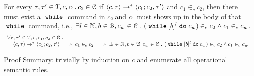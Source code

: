 %
\begin{lem}
	\label{lem:inv_while}
	For every $\mathtt{\tau}, \mathtt{\tau}' \in \mathcal{T}, c, c_1, c_2 \in \mathcal{C}$ 
	if $ \langle c, \mathtt{\tau} \rangle \rightarrow^* \langle c_1; c_2, \mathtt{\tau}' \rangle$ and 
	$c_1 \in_c c_2$, 
	then there must exist a $\;\mathtt{while}\;$ command in $c_2$ and $c_1$ must shows up in the body of that $\;\mathtt{while}\;$ command,
	 i.e., $\exists l \in \mathbb{N}, b \in \mathcal{B}, c_w \in \mathcal{C} ~.~ 
	(\;\mathtt{while}\; [b]^l \;\mathtt{do}\; c_w) \in_c c_2 \land c_1 \in_c c_w$.
	\[
	\begin{array}{l}
	\forall \mathtt{\tau}, \mathtt{\tau}' \in \mathcal{T}, c, c_1, c_2 \in \mathcal{C} ~.~
		\\ \quad
		\langle c, \mathtt{\tau} \rangle \rightarrow^* \langle c_1; c_2, \mathtt{\tau}' \rangle
		\implies
		c_1 \in_c c_2
		\implies
		\exists l \in \mathbb{N}, b \in \mathcal{B}, c_w \in \mathcal{C} ~.~ 
		(\;\mathtt{while}\; [b]^l \;\mathtt{do}\; c_w) \in_c c_2 \land c_1 \in_c c_w
	\end{array}
	\]
	\end{lem}	
	Proof Summary: trivially by induction on $c$ and enumerate all operational semantic rules.
